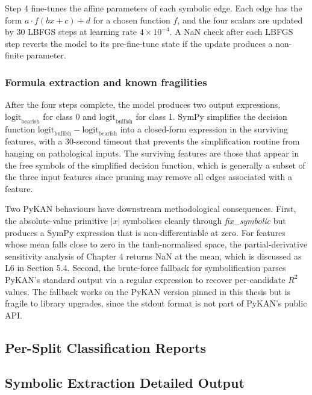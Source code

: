 \documentclass[12pt,a4paper,oneside]{article}
\begin{document}
Step 4 fine-tunes the affine parameters of each symbolic edge. Each edge has the form $a \cdot f(b x + c) + d$ for a chosen function $f$, and the four scalars are updated by 30 LBFGS steps at learning rate $4 \times 10^{-4}$. A NaN check after each LBFGS step reverts the model to its pre-fine-tune state if the update produces a non-finite parameter.


\subsubsection{Formula extraction and known fragilities}\label{app:symbolic_fragilities}

After the four steps complete, the model produces two output expressions, $\text{logit}_{\text{bearish}}$ for class 0 and $\text{logit}_{\text{bullish}}$ for class 1. SymPy simplifies the decision function $\text{logit}_{\text{bullish}} - \text{logit}_{\text{bearish}}$ into a closed-form expression in the surviving features, with a 30-second timeout that prevents the simplification routine from hanging on pathological inputs. The surviving features are those that appear in the free symbols of the simplified decision function, which is generally a subset of the three input features since pruning may remove all edges associated with a feature.

Two PyKAN behaviours have downstream methodological consequences. First, the absolute-value primitive $|x|$ symbolises cleanly through \textit{fix\_symbolic} but produces a SymPy expression that is non-differentiable at zero. For features whose mean falls close to zero in the tanh-normalised space, the partial-derivative sensitivity analysis of Chapter 4 returns NaN at the mean, which is discussed as L6 in Section 5.4. Second, the brute-force fallback for symbolification parses PyKAN's standard output via a regular expression to recover per-candidate $R^2$ values. The fallback works on the PyKAN version pinned in this thesis but is fragile to library upgrades, since the stdout format is not part of PyKAN's public API.


\subsection{Per-Split Classification Reports}\label{app:split_reports}

\subsection{Symbolic Extraction Detailed Output}\label{app:symbolic}
\end{document}
